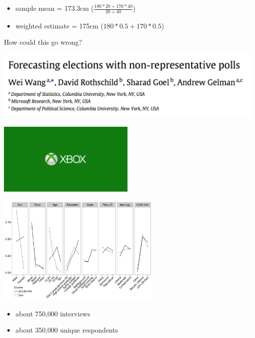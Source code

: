 \documentclass[aspectratio=169]{beamer}
\begin{document}
\begin{frame}

\begin{itemize}
\item sample mean = 173.3cm ($\frac{180 * 20 + 170 * 40}{20 + 40}$)
\pause
\item weighted estimate = 175cm ($180 * 0.5 + 170 * 0.5$)
\end{itemize}
\pause
How could this go wrong?

\end{frame}
\begin{frame}

\begin{center}
\includegraphics[width=\textwidth]{figures/wang_forecasting_2015_title}
\end{center}

\begin{center}
\includegraphics[width=0.5\textwidth]{figures/xboxlogo}
\end{center}

\end{frame}
\begin{frame}

\begin{center}
\includegraphics[width=0.6\textwidth]{figures/bitbybit3-7_wang_forecasting_2015_fig1}
\end{center}

\begin{itemize}
\item about 750,000 interviews
\item about 350,000 unique respondents
\end{itemize}

\end{frame}
\end{document}
